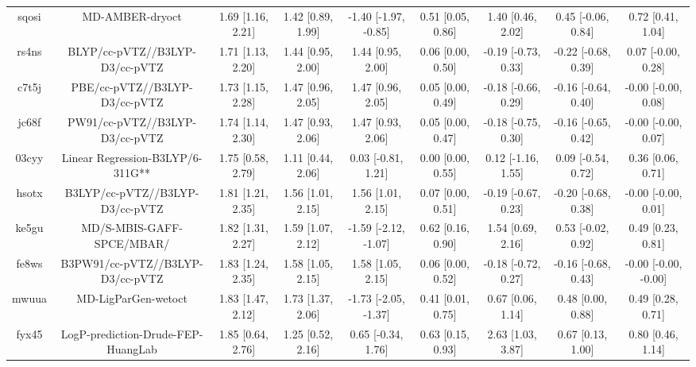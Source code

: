 \documentclass{article}
\begin{document}
\begin{center}
\begin{longtable}{|ccccccccc|}
 sqosi &                                    MD-AMBER-dryoct &  1.69 [1.16, 2.21] &  1.42 [0.89, 1.99] &  -1.40 [-1.97, -0.85] &  0.51 [0.05, 0.86] &    1.40 [0.46, 2.02] &   0.45 [-0.06, 0.84] &     0.72 [0.41, 1.04] \\
 rs4ns &                     BLYP/cc-pVTZ//B3LYP-D3/cc-pVTZ &  1.71 [1.13, 2.20] &  1.44 [0.95, 2.00] &     1.44 [0.95, 2.00] &  0.06 [0.00, 0.50] &  -0.19 [-0.73, 0.33] &  -0.22 [-0.68, 0.39] &    0.07 [-0.00, 0.28] \\
 c7t5j &                      PBE/cc-pVTZ//B3LYP-D3/cc-pVTZ &  1.73 [1.15, 2.28] &  1.47 [0.96, 2.05] &     1.47 [0.96, 2.05] &  0.05 [0.00, 0.49] &  -0.18 [-0.66, 0.29] &  -0.16 [-0.64, 0.40] &   -0.00 [-0.00, 0.08] \\
 jc68f &                     PW91/cc-pVTZ//B3LYP-D3/cc-pVTZ &  1.74 [1.14, 2.30] &  1.47 [0.93, 2.06] &     1.47 [0.93, 2.06] &  0.05 [0.00, 0.47] &  -0.18 [-0.75, 0.30] &  -0.16 [-0.65, 0.42] &   -0.00 [-0.00, 0.07] \\
 03cyy &                   Linear Regression-B3LYP/6-311G** &  1.75 [0.58, 2.79] &  1.11 [0.44, 2.06] &    0.03 [-0.81, 1.21] &  0.00 [0.00, 0.55] &   0.12 [-1.16, 1.55] &   0.09 [-0.54, 0.72] &     0.36 [0.06, 0.71] \\
 hsotx &                    B3LYP/cc-pVTZ//B3LYP-D3/cc-pVTZ &  1.81 [1.21, 2.35] &  1.56 [1.01, 2.15] &     1.56 [1.01, 2.15] &  0.07 [0.00, 0.51] &  -0.19 [-0.67, 0.23] &  -0.20 [-0.68, 0.38] &   -0.00 [-0.00, 0.01] \\
 ke5gu &                          MD/S-MBIS-GAFF-SPCE/MBAR/ &  1.82 [1.31, 2.27] &  1.59 [1.07, 2.12] &  -1.59 [-2.12, -1.07] &  0.62 [0.16, 0.90] &    1.54 [0.69, 2.16] &   0.53 [-0.02, 0.92] &     0.49 [0.23, 0.81] \\
 fe8ws &                   B3PW91/cc-pVTZ//B3LYP-D3/cc-pVTZ &  1.83 [1.24, 2.35] &  1.58 [1.05, 2.15] &     1.58 [1.05, 2.15] &  0.06 [0.00, 0.52] &  -0.18 [-0.72, 0.27] &  -0.16 [-0.68, 0.43] &  -0.00 [-0.00, -0.00] \\
 mwuua &                                MD-LigParGen-wetoct &  1.83 [1.47, 2.12] &  1.73 [1.37, 2.06] &  -1.73 [-2.05, -1.37] &  0.41 [0.01, 0.75] &    0.67 [0.06, 1.14] &    0.48 [0.00, 0.88] &     0.49 [0.28, 0.71] \\
 fyx45 &                 LogP-prediction-Drude-FEP-HuangLab &  1.85 [0.64, 2.76] &  1.25 [0.52, 2.16] &    0.65 [-0.34, 1.76] &  0.63 [0.15, 0.93] &    2.63 [1.03, 3.87] &    0.67 [0.13, 1.00] &     0.80 [0.46, 1.14] \\

\end{longtable}
\end{center}
\end{document}
